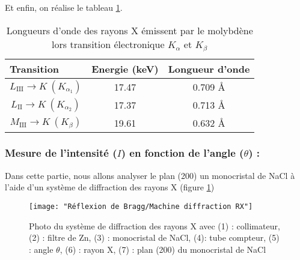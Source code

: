\newpage
Et enfin, on réalise le tableau \ref{tab: Transition nergitique en les diffrentes couche du molybdne et les diffrentes longueurs donde misse par les transitions}. 
\begin{table}[h!]
	\centering
	\begin{tabular}{|c|c|c|}
		\hline
		\multicolumn{1}{|l|}{\textbf{Transition}} & \multicolumn{1}{l|}{\textbf{Energie (keV)}} & \multicolumn{1}{l|}{\textbf{Longueur d'onde}} \\ \hline
		$L_{\mathrm{III}} \to K \ (K_{\alpha_1}) $                    & 17.47                                       & 0.709 \AA                                       \\ \hline
		$L_{\mathrm{II}} \to K \ (K_{\alpha_2}) $                      & 17.37                                       & 0.713 \AA                                       \\ \hline
		$M_{\mathrm{III}} \to K \ (K_{\beta}) $                         & 19.61                                       & 0.632 \AA                                       \\ \hline
	\end{tabular}
	\caption{\centering Longueurs d’onde des rayons X émissent par le molybdène lors transition électronique $ K_{\alpha} $ et $ K_{\beta} $}
	\label{tab: Transition nergitique en les diffrentes couche du molybdne et les diffrentes longueurs donde misse par les transitions}
\end{table}





\subsubsection{Mesure de l’intensité ($I$) en fonction de l’angle ($\theta$) :}
Dans cette partie, nous allons analyser le plan (200) un monocristal de NaCl à l'aide d'un système de diffraction des rayons X (figure \ref{fig:machine-diffraction-rx})

\begin{figure}[h!]
	\centering
	\texttt{[image: "Réflexion de Bragg/Machine diffraction RX"]}
	\caption{\centering Photo du système de diffraction des rayons X avec (1) : collimateur, (2) : filtre de Zn, (3) : monocristal de NaCl, (4): tube compteur, (5) : angle $\theta$, (6) : rayon X, (7) : plan (200) du monocristal de NaCl }
	\label{fig:machine-diffraction-rx}
\end{figure}



